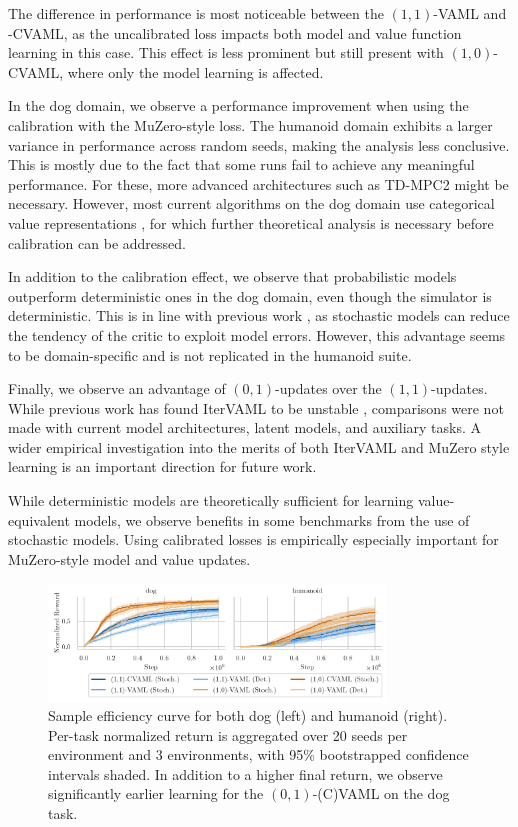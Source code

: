 The difference in performance is most noticeable between the $(1,1)$-VAML and -CVAML, as the uncalibrated loss impacts both model and value function learning in this case. 
This effect is less prominent but still present with $(1,0)$-CVAML, where only the model learning is affected.

In the dog domain, we observe a performance improvement when using the calibration with the MuZero-style loss.
The humanoid domain exhibits a larger variance in performance across random seeds, making the analysis less conclusive.
This is mostly due to the fact that some runs fail to achieve any meaningful performance.
For these, more advanced architectures such as TD-MPC2 \parencite{hansen2024tdmpc} might be necessary.
However, most current algorithms on the dog domain use categorical value representations \parencite{farebrother2024stop}, for which further theoretical analysis is necessary before calibration can be addressed.

In addition to the calibration effect, we observe that probabilistic models outperform deterministic ones in the dog domain, even though the simulator is deterministic.
This is in line with previous work \parencite{pets,mbpo}, as stochastic models can reduce the tendency of the critic to exploit model errors.
However, this advantage seems to be domain-specific and is not replicated in the humanoid suite.

Finally, we observe an advantage of $(0,1)$-updates over the $(1,1)$-updates.
While previous work has found IterVAML to be unstable \parencite{lovatto2020decision,voelcker2022value}, comparisons were not made with current model architectures, latent models, and auxiliary tasks.
A wider empirical investigation into the merits of both IterVAML and MuZero style learning is an important direction for future work.

\begin{boxinsight}
While deterministic models are theoretically sufficient for learning value-equivalent models, we observe benefits in some benchmarks from the use of stochastic models.
Using calibrated losses is empirically especially important for MuZero-style model and value updates.
\end{boxinsight}

\begin{figure}[t]
    \centering
    \includegraphics[width=0.8\textwidth]{figures/lambda/plts/reward.pdf} 
    \caption{Sample efficiency curve for both dog (left) and humanoid (right). Per-task normalized return is aggregated over 20 seeds per environment and 3 environments, with 95\% bootstrapped confidence intervals shaded. 
    In addition to a higher final return, we observe significantly earlier learning for the $(0,1)$-(C)VAML on the dog task.}
   \label{fig:cvaml:dmc_reward}
\end{figure}

